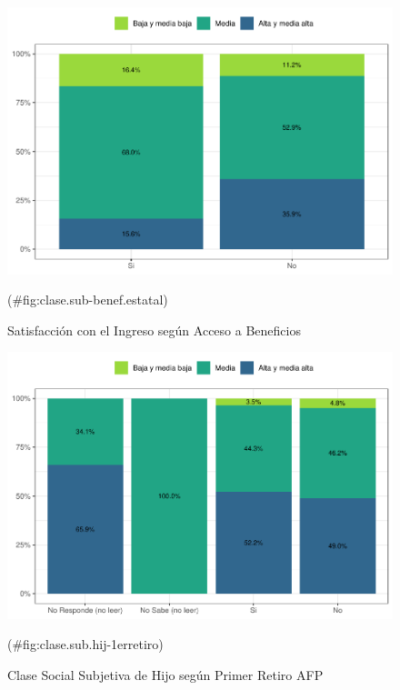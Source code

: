 \documentclass[
  12pt,
]{book}
\begin{document}
\begin{figure}

{\centering \includegraphics{reporte-elsoc_files/figure-latex/clase.sub-benef.estatal-1} 

}

\caption{Satisfacción con el Ingreso según Acceso a Beneficios}(\#fig:clase.sub-benef.estatal)
\end{figure}

\begin{figure}

{\centering \includegraphics{reporte-elsoc_files/figure-latex/clase.sub.hij-1erretiro-1} 

}

\caption{Clase Social Subjetiva de Hijo según Primer Retiro AFP}(\#fig:clase.sub.hij-1erretiro)
\end{figure}
\end{document}
